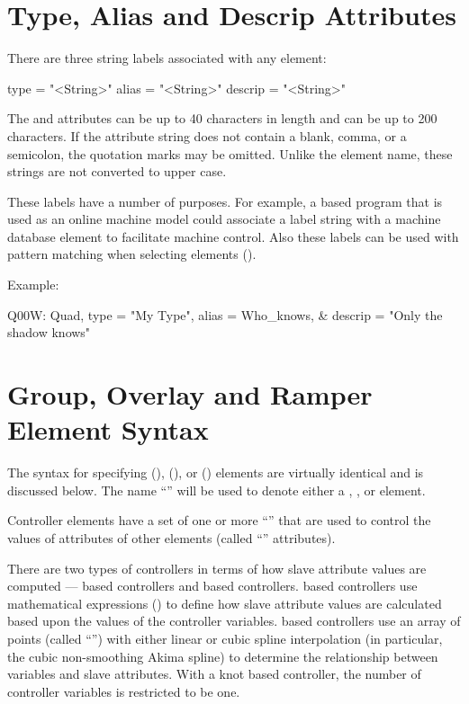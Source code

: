 \section{Type, Alias and Descrip Attributes}
\label{s:alias}

There are three string labels associated with any element:
\begin{example}
  type    = "<String>"
  alias   = "<String>"
  descrip = "<String>"
\end{example}
The  and  attributes can be up to 40 characters in length and  can be
up to 200 characters. If the attribute string does not contain a blank, comma, or a semicolon, the
quotation marks may be omitted. Unlike the element name, these strings are not converted to upper case.

These labels have a number of purposes. For example, a \bmad based program that is used as an online
machine model could associate a label string with a machine database element to facilitate machine
control. Also these labels can be used with pattern matching when selecting elements ().

Example:
\begin{example}
  Q00W: Quad, type = "My Type", alias = Who_knows, &
                                  descrip = "Only the shadow knows"
\end{example}

\section{Group, Overlay and Ramper Element Syntax}
\label{s:go.syntax}

The syntax for specifying  (),  (), or
 () elements
are virtually identical and is discussed below. The name ``'' will be used to denote
either a , , or  element.

Controller elements have a set of one or more ``'' that are used to control the values
of attributes of other elements (called ``'' attributes).

There are two types of controllers in terms of how slave attribute values are computed ---
 based controllers and  based controllers.  based controllers
use mathematical expressions () to define how slave attribute values are calculated
based upon the values of the controller variables.  based controllers use an array of
points (called ``'') with either linear or cubic spline interpolation (in particular, the
cubic non-smoothing Akima spline\cite{b:akima}) to determine the relationship between variables and
slave attributes. With a knot based controller, the number of controller variables is restricted
to be one.

